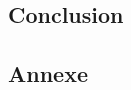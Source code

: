 \documentclass[a4paper, 12pt]{report}
\begin{document}
\begin{spacing}{1.3}
	\textcolor{colortitre2}{\subsection*{}}    


\textcolor{colortitre1}{\section*{}} 

\textcolor{colortitre1}{\section*{Conclusion}} 

\newpage
\textcolor{colortitre1}{\section*{Annexe}}   

	
	
	
	\end{spacing}
\end{document}
